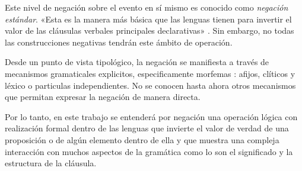 Este nivel de negación sobre el evento en sí mismo es conocido como \textit{negación estándar}. «Esta es la manera más básica que las lenguas tienen para invertir el valor de las cláusulas verbales principales declarativas» \textcolor{MidnightBlue}{\citep{negStandar}}. Sin embargo, no todas las construcciones negativas tendrán este ámbito de operación.

Desde un punto de vista tipológico, la negación se manifiesta a través de mecanismos gramaticales explicitos, especificamente morfemas \textcolor{MidnightBlue}{\citep{morfemas}}: afijos, clíticos y léxico o particulas independientes. No se conocen hasta ahora otros mecanismos que permitan expresar la negación de manera directa.

Por lo tanto, en este trabajo se entenderá por negación una operación lógica con realización formal dentro de las lenguas que invierte el valor de verdad de una proposición o de algún elemento dentro de ella y que muestra una compleja interacción con muchos aspectos de la gramática como lo son el significado y la estructura de la cláusula.